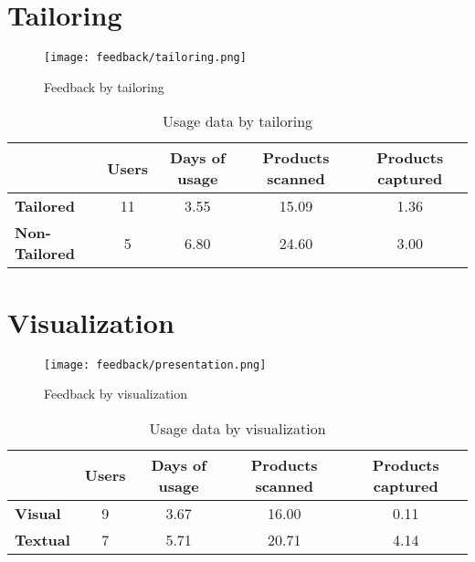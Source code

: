 \newpage

\section{Tailoring}

    \begin{figure}[H]
      \centering
      \texttt{[image: feedback/tailoring.png]}
      \caption{Feedback by tailoring}
      \label{fig:feedback-tailoring}
      \end{figure}
      
    \begin{table}[H]
        \begin{tabular}{l|c|c|c|c|}
        \cline{2-5}
            & Users & Days of usage & Products scanned & Products captured \\ \hline
            \multicolumn{1}{|l|}{\textbf{Tailored}}     & 11          & 3.55          & 15.09            & 1.36              \\ \hline
            \multicolumn{1}{|l|}{\textbf{Non-Tailored}} & 5           & 6.80          & 24.60            & 3.00              \\ \hline
        \end{tabular}
        \caption{Usage data by tailoring}
        \label{tab:usage-tailoring}
    \end{table}

\section{Visualization}

    \begin{figure}[H]
      \centering
      \texttt{[image: feedback/presentation.png]}
      \caption{Feedback by visualization}
      \label{fig:feedback-presentation}
      \end{figure}
      
    \begin{table}[H]
        \begin{tabular}{l|c|c|c|c|}
        \cline{2-5}
            & Users & Days of usage & Products scanned & Products captured \\ \hline
            \multicolumn{1}{|l|}{\textbf{Visual}}     & 9          & 3.67	          & 16.00        & 0.11              \\ \hline
            \multicolumn{1}{|l|}{\textbf{Textual}} & 7           & 5.71          & 20.71            & 4.14              \\ \hline
        \end{tabular}
        \caption{Usage data by visualization}
        \label{tab:usage-presentation}
    \end{table}

